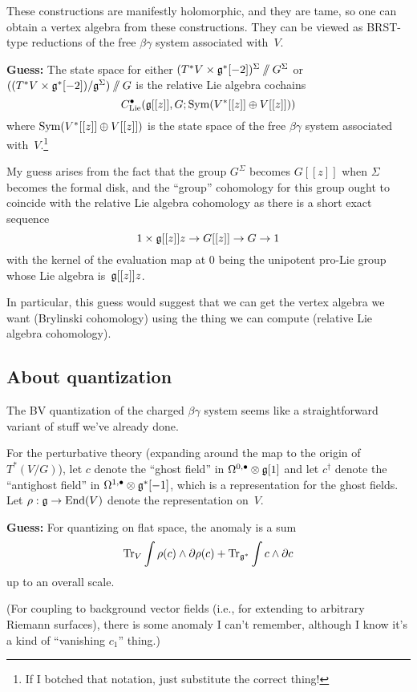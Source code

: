 \documentclass[11pt]{amsart}
\begin{document}
These constructions are manifestly holomorphic, 
and they are tame,
so one can obtain a vertex algebra from these constructions.
They can be viewed as BRST-type reductions of the free $\beta\gamma$ system associated with~$V$.

{\bf Guess:} The state space for either $(T^*V \times \mathfrak g^*[-2])^\Sigma \mathbin{/\mkern-6mu/} G^\Sigma$ or $((T^* V \times \mathfrak g^*[-2])/\mathfrak g^\Sigma)\mathbin{/\mkern-6mu/} G$ is the relative Lie algebra cochains
\[
C^\bullet_{\rm Lie}(\mathfrak g[[z]], G; \operatorname{Sym}(V^*[[z]] \oplus V[[z]]))
\]
where $\operatorname{Sym}(V^*[[z]] \oplus V[[z]])$ is the state space of the free $\beta\gamma$ system associated with~$V$.\footnote{If I botched that notation, just substitute the correct thing!}

My guess arises from the fact that the group $G^\Sigma$ becomes $G[[z]]$ when $\Sigma$ becomes the formal disk,
and the ``group'' cohomology for this group ought to coincide with the relative Lie algebra cohomology as there is a short exact sequence
\[
1 \times \mathfrak g[[z]]z \to G[[z]] \to G \to 1
\]
with the kernel of the evaluation map at 0 being the unipotent pro-Lie group whose Lie algebra is~$\mathfrak g[[z]]z$.

In particular, this guess would suggest that we can get the vertex algebra we want (Brylinski cohomology) using the thing we can compute (relative Lie algebra cohomology).

\subsection{About quantization}

The BV quantization of the charged $\beta\gamma$ system seems like a straightforward variant of stuff we've already done. 

For the perturbative theory (expanding around the map to the origin of $T^*(V/G)$), let $c$ denote the ``ghost field'' in $\Omega^{0,\bullet} \otimes \mathfrak g[1]$ and let $c^\dagger$ denote the ``antighost field'' in $\Omega^{1,\bullet} \otimes \mathfrak g^*[-1]$, 
which is a representation for the ghost fields.
Let $\rho: \mathfrak g \to {\rm End}(V)$ denote the representation on~$V$. 

{\bf Guess:} For quantizing on flat space, the anomaly is a sum 
\[
\operatorname{Tr}_V \int \rho(c) \wedge \partial \rho(c) + \operatorname{Tr}_{\mathfrak g^*} \int c \wedge \partial c
\]
up to an overall scale.

(For coupling to background vector fields (i.e., for extending to arbitrary Riemann surfaces), 
there is some anomaly I can't remember, although I know it's a kind of ``vanishing $c_1$'' thing.)
\end{document}
